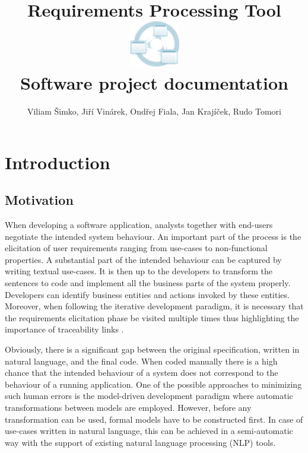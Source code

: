\documentclass[12pt,a4paper]{article}
\title{\textbf{Requirements Processing Tool}\\\vspace{26pt}\includegraphics[height=2cm]{logo.png}\\\vspace{16pt}\textbf{Software project documentation}}
\author{Viliam Šimko, Jiří Vinárek, Ondřej Fiala, Jan Krajíček, Rudo Tomori}
\date{} %
\begin{document}
\maketitle
\thispagestyle{empty} %

\newpage

\tableofcontents
\vspace{12pt}


\section{Introduction}

\subsection{Motivation}
When developing a software application, analysts together with end-users negotiate the intended system behaviour.  An important part of the process is the elicitation of user requirements ranging from use-cases to non-functional properties.  A substantial part of the intended behaviour can be captured by writing textual use-cases.  It is then up to the developers to transform the sentences to code and implement all the business parts of the system properly.  Developers can identify business entities and actions invoked by these entities.  Moreover, when following the iterative development paradigm, it is necessary that the requirements elicitation phase be visited multiple times thus highlighting the importance of traceability links \cite{LARMAN}.

Obviously, there is a significant gap between the original specification, written in natural language, and the final code.  When coded manually there is a high chance that the intended behaviour of a system does not correspond to the behaviour of a running application.  One of the possible approaches to minimizing such human errors is the model-driven development paradigm \cite{MDD} where automatic transformations between models are employed.  However, before any transformation can be used, formal models have to be constructed first.  In case of use-cases written in natural language, this can be achieved in a semi-automatic way with the support of existing natural language processing (NLP) tools.
\end{document}
